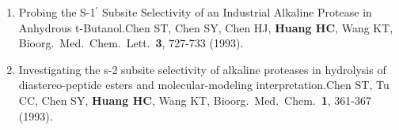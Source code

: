 \documentclass[10pt,a4paper]{article}
\def\mypub#1#2#3{{#1.}\newline #2, #3.}
\def\newpub#1#2#3{{\boldmath \bf #2.}\newline #1, #3.}
\begin{document}
\begin{enumerate}
\item 
\mypub{Probing the S-1$^\prime$ Subsite Selectivity of an Industrial
Alkaline Protease in Anhydrous t-Butanol}
{Chen ST, Chen SY, Chen HJ, {\bf Huang HC}, Wang KT}
{Bioorg.\ Med.\ Chem.\ Lett.\  {\bf 3}, 727-733 (1993)}

\item 
\mypub{Investigating the s-2 subsite selectivity of alkaline proteases in hydrolysis of diastereo-peptide esters and molecular-modeling interpretation}
{Chen ST, Tu CC, Chen SY, {\bf Huang HC}, Wang KT}
{Bioorg.\ Med.\ Chem.\ {\bf 1}, 361-367 (1993)}









\end{enumerate}
\end{document}
